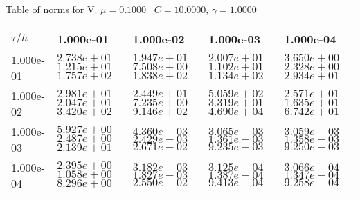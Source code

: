 \begin{center}
Table of norms for V. $\mu = 0.1000$ \, $C = 10.0000$, $\gamma = 1.0000$
  
\begin{tabular}{|p{1in}|p{1in}|p{1in}|p{1in}|p{1in}|} \hline
$\tau / h$ &1.000e-01 &1.000e-02 &1.000e-03 &1.000e-04 \\ \hline 
1.000e-01 & $2.738e+01$  $1.215e+01$  $1.757e+02$  & $1.947e+01$  $7.508e+00$  $1.838e+02$  & $2.007e+01$  $1.102e+01$  $1.134e+02$  & $3.650e+00$  $2.328e+00$  $2.934e+01$  \\ \hline 
1.000e-02 & $2.981e+01$  $2.047e+01$  $3.420e+02$  & $2.449e+01$  $7.235e+00$  $9.146e+02$  & $5.059e+02$  $3.319e+01$  $4.690e+04$  & $2.571e+01$  $1.635e+01$  $6.742e+01$  \\ \hline 
1.000e-03 & $5.927e+00$  $2.487e+00$  $2.139e+01$  & $4.360e-03$  $2.429e-03$  $2.671e-02$  & $3.065e-03$  $1.361e-03$  $9.235e-03$  & $3.059e-03$  $1.358e-03$  $9.250e-03$  \\ \hline 
1.000e-04 & $2.395e+00$  $1.058e+00$  $8.296e+00$  & $3.182e-03$  $1.827e-03$  $2.550e-02$  & $3.125e-04$  $1.387e-04$  $9.413e-04$  & $3.066e-04$  $1.347e-04$  $9.258e-04$  \\ \hline 

\end{tabular}\\[20pt]
\end{center}
